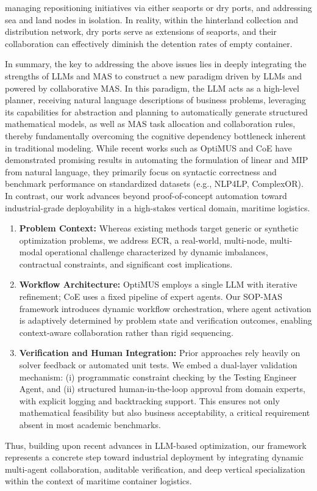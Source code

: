 \documentclass[preprint,12pt]{elsarticle}
\begin{document}
managing repositioning initiatives via either seaports or dry ports, and addressing sea and land nodes in isolation. In reality, within the hinterland collection and distribution network, dry ports serve as extensions of seaports, and their collaboration can effectively diminish the detention rates of empty container.


In summary, the key to addressing the above issues lies in deeply integrating the strengths of LLMs and MAS to construct a new paradigm driven by LLMs and powered by collaborative MAS. In this paradigm, the LLM acts as a high-level planner, receiving natural language descriptions of business problems, leveraging its capabilities for abstraction and planning to automatically generate structured mathematical models, as well as MAS task allocation and collaboration rules, thereby fundamentally overcoming the cognitive dependency bottleneck inherent in traditional modeling. While recent works such as OptiMUS \cite{ahmaditeshniziOptiMUSScalableOptimization2024} and CoE \cite{xiaoChainofExpertsWhenLLMs2024} have demonstrated promising results in automating the formulation of linear and MIP from natural language, they primarily focus on syntactic correctness and benchmark performance on standardized datasets (e.g., NLP4LP, ComplexOR). In contrast, our work advances beyond proof-of-concept automation toward industrial-grade deployability in a high-stakes vertical domain, maritime logistics.
\begin{enumerate}[label=\arabic*)]

\item \textbf{Problem Context:} Whereas existing methods target generic or synthetic optimization problems, we address ECR, a real-world, multi-node, multi-modal operational challenge characterized by dynamic imbalances, contractual constraints, and significant cost implications.
\item \textbf{Workflow Architecture:} OptiMUS employs a single LLM with iterative refinement; CoE uses a fixed pipeline of expert agents. Our SOP-MAS framework introduces dynamic workflow orchestration, where agent activation is adaptively determined by problem state and verification outcomes, enabling context-aware collaboration rather than rigid sequencing.
\item \textbf{Verification and Human Integration:} Prior approaches rely heavily on solver feedback or automated unit tests. We embed a dual-layer validation mechanism: (i) programmatic constraint checking by the Testing Engineer Agent, and (ii) structured human-in-the-loop approval from domain experts, with explicit logging and backtracking support. This ensures not only mathematical feasibility but also business acceptability, a critical requirement absent in most academic benchmarks.
\end{enumerate}
Thus, building upon recent advances in LLM-based optimization, our framework represents a concrete step toward industrial deployment by integrating dynamic multi-agent collaboration, auditable verification, and deep vertical specialization within the context of maritime container logistics.
\end{document}
